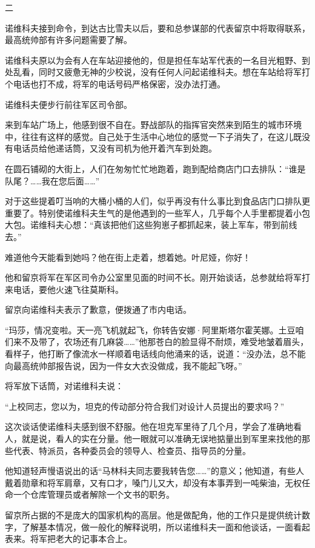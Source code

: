 二

诺维科夫接到命令，到达古比雪夫以后，要和总参谋部的代表留京中将取得联系，最高统帅部有许多问题需要了解。

诺维科夫原以为会有人在车站迎接他的，但是担任车站军代表的一名目光粗野、到处乱看，同时又疲惫无神的少校说，没有任何人问起诺维科夫。想在车站给将军打个电话也打不成，将军的电话号码严格保密，没办法打通。

诺维科夫便步行前往军区司令部。

来到车站广场上，他感到很不自在。野战部队的指挥官突然来到陌生的城市环境中，往往有这样的感觉。自己处于生活中心地位的感觉一下子消失了，在这儿既没有电话员给他递话筒，又没有司机为他开着汽车到处跑。

在圆石铺砌的大街上，人们在匆匆忙忙地跑着，跑到配给商店门口去排队：“谁是队尾？……我在您后面……”

对于这些提着叮当响的大桶小桶的人们，似乎再没有什么事比到食品店门口排队更重要了。特别使诺维科夫生气的是他遇到的一些军人，几乎每个人手里都提着小包大包。诺维科夫心想：“真该把他们这些狗崽子都抓起来，装上军车，带到前线去。”

难道他今天能看到她吗？他在街上走着，想着她。叶尼娅，你好！

他和留京将军在军区司令办公室里见面的时间不长。刚开始谈话，总参就给将军打来电话，要他火速飞往莫斯科。

留京向诺维科夫表示了歉意，便拨通了市内电话。

“玛莎，情况变啦。天一亮飞机就起飞，你转告安娜·阿里斯塔尔霍芙娜。土豆咱们来不及带了，农场还有几麻袋……”他那苍白的脸显得不耐烦，难受地皱着眉头，看样子，他打断了像流水一样顺着电话线向他涌来的话，说道：“没办法，总不能向最高统帅部报告说，因为一件女大衣没做成，我不能起飞呀。”

将军放下话筒，对诺维科夫说：

“上校同志，您以为，坦克的传动部分符合我们对设计人员提出的要求吗？”

这次谈话使诺维科夫感到很不舒服。他在坦克军里待了几个月，学会了准确地看人，就是说，看人的实在分量。他一眼就可以准确无误地掂量出到军里来找他的那些代表、特派员，各种委员会的领导人、检查员、指导员的分量。

他知道轻声慢语说出的话“马林科夫同志要我转告您……”的意义；他知道，有些人戴着勋章和将军肩章，又有口才，嗓门儿又大，却没有本事弄到一吨柴油，无权任命一个仓库管理员或者解除一个文书的职务。

留京所占据的不是庞大的国家机构的高层。他是做配角，他的工作只是提供统计数字，了解基本情况，做一般化的解释说明，所以诺维科夫一面和他谈话，一面看起表来。将军把老大的记事本合上。

